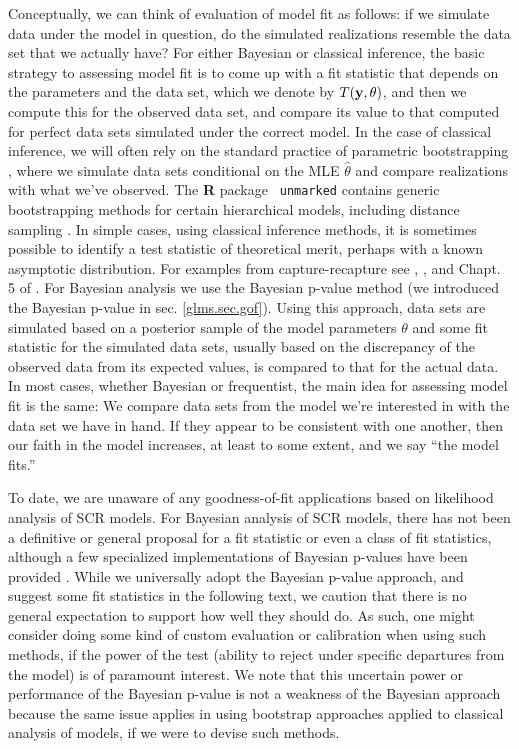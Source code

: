 Conceptually, we can think of evaluation of model fit as follows: if
we simulate data under the model in question, do the simulated
realizations resemble the data set that we actually have?  For either
Bayesian or classical inference, the basic strategy to assessing model
fit is to come up with a fit statistic that depends on the parameters
and the data set, which we denote by $T({\bf y}, \theta)$, and then we
compute this for the observed data set, and compare its value to that
computed for perfect data sets simulated under the correct model.  In
the case of classical inference, we will often rely on the standard
practice of parametric bootstrapping \citep{dixon:2002}, where we
simulate data sets conditional on the MLE $\hat{\theta}$ and compare
realizations with what we've observed.  The {\bf R} package \mbox{\tt
  unmarked} \citep{fiske_chandler:2011} contains generic bootstrapping
methods for certain hierarchical models, including distance sampling
\citep[e.g., see][for an application]{sillett_etal:2012}.  In simple
cases, using classical inference methods, it is sometimes possible to
identify a test statistic of theoretical merit, perhaps with a known
asymptotic distribution.  For examples from capture-recapture see
\citet{burnham_etal:1987}, \citet{lebreton_etal:1992}, and Chapt. 5 of
  \citet{cooch_white:2006}.  For Bayesian analysis we use the Bayesian
  p-value method \citep{gelman_etal:1996} (we introduced the Bayesian
  p-value in sec. \ref{glms.sec.gof}).  Using this approach, data sets
  are simulated based on a posterior sample of the model parameters
  $\theta$ and some fit statistic for the simulated data sets, usually
  based on the discrepancy of the observed data from its expected
  values, is compared to that for the actual data.  In most cases,
  whether Bayesian or frequentist, the main idea for assessing model
  fit is the same: We compare data sets from the model we're
  interested in with the data set we have in hand. If they appear to
  be consistent with one another, then our faith in the model
  increases, at least to some extent, and we say ``the model fits.''


To date, we are unaware of any goodness-of-fit applications based on
likelihood analysis of SCR models. For 
Bayesian analysis of SCR models, there has not been a definitive or
general proposal for a fit statistic or even a class of fit
statistics, although a few specialized implementations of Bayesian
p-values have been provided \citep{royle:2009,royle_etal:2011mee,
  gopalaswamy_etal:2012mee,gopalaswamy_etal:2012ecol,russell_etal:2012}.
While we universally adopt the Bayesian p-value approach, and suggest
some fit statistics in the following text, we caution that there is
no general expectation to support how well they should do.
As such, one might consider doing some kind of custom
evaluation or calibration when using such methods, if the power of the
test (ability to reject under specific departures from the model) is
of paramount interest.  We note that this uncertain power or
performance of the Bayesian p-value is not a weakness of the Bayesian
approach because the same issue applies in using bootstrap approaches
applied to classical analysis of models, if we were to devise such
methods.



